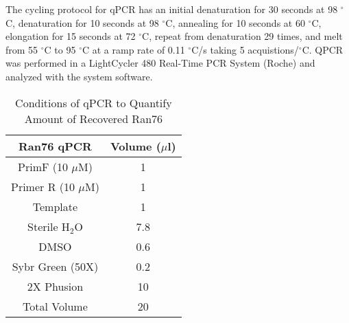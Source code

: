 \documentclass[12pt,twoside]{reedthesis}
\begin{document}
 The cycling protocol for qPCR has an initial denaturation for 30 seconds at 98 $^{\circ}$C, denaturation for 10 seconds at 98 $^{\circ}$C, annealing for 10 seconds at 60 $^{\circ}$C, elongation for 15 seconds at 72 $^{\circ}$C, repeat from denaturation 29 times, and melt from 55 $^{\circ}$C to 95 $^{\circ}$C at a ramp rate of 0.11 $^{\circ}$C/s taking 5 acquistions/$^{\circ}$C. QPCR was performed in a LightCycler\textsuperscript{\textregistered} 480 Real-Time PCR System (Roche) and analyzed with the system software. 


\begin{table}[H]
	\caption[qPCR Conditions for Ran76]{Conditions of qPCR to Quantify Amount of Recovered Ran76} 
	\centering
	\label{qPCRRan76}
	\begin{tabular}{|c | c|}
		\hline
		 Ran76 qPCR & Volume ($\mu$l) \\
		\hline 
		 PrimF (10 $\mu$M) & 1   \\ 
		 Primer R (10 $\mu$M) & 1  \\  			
		Template &  1  \\
		 Sterile H$_{2}$O & 7.8 \\ 
		 DMSO & 0.6 \\  
		 Sybr Green (50X) & 0.2 \\     
		 2X Phusion & 10 \\
		\hline   
		 Total Volume & 20  \\
		\hline
	\end{tabular}
\end{table}
\end{document}
